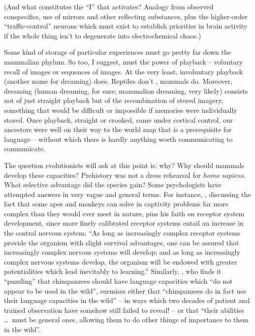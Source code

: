 (And what constitutes the ``I'' that activates? Analogy from observed conspecifics, use of mirrors and other reflecting substances, plus the higher-order ``traffic-control'' neurons which must exist to establish priorities in brain activity if the whole thing isn't to degenerate into electrochemical chaos.)

Some kind of  storage of particular experiences must go pretty far down the mammalian phylum. So too, I suggest, must
the power of playback -- voluntary recall of images or sequences of images. At the very least, involuntary playback (another name for dreaming) does. Reptiles don't , mammals do. Moreover, dreaming (human dreaming, for sure; mammalian dreaming, very likely) consists not of just straight playback but of the recombination of stored imagery, something that would be difficult or impossible if memories were individually stored. Once playback, straight or crooked, came under cortical control, our ancestors were well on their way to the world map that is a prerequisite for language -- without which there is hardly anything worth communicating to communicate.

The question evolutionists will ask at this point is: why? Why should mammals develop these capacities? Prehistory was not a dress rehearsal for \textit{homo sapiens}. What selective advantage did the species gain? Some psychologists have attempted answers in very vague and general terms. For instance, \citet{Harlow1958}, discussing the fact that some apes and monkeys can solve in captivity problems far more complex than they would ever meet in nature, pins his faith on receptor system development, since more finely calibrated receptor systems entail an increase in the central nervous system: ``As long as increasingly complex receptor systems provide the organism with slight survival advantages, one can be assured that increasingly complex nervous systems will develop; and as long as increasingly complex nervous systems develop, the organism will be endowed with greater potentialities which lead inevitably to learning.'' Similarly, \citet{Passingham1979}, who finds it ``puzzling'' that chimpanzees should have language capacities which ``do not appear to be used in the wild'', surmises either that ``chimpanzees do in fact use their language capacities in the wild'' -- in ways which two decades of patient and trained observation have somehow still failed to reveal! -- or that ``their abilities \ldots~must be general ones, allowing them to do other things of importance to them in the wild''.

